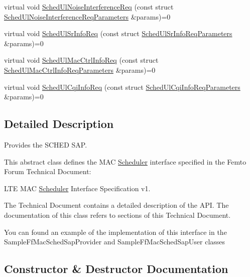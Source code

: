 \begin{DoxyCompactItemize}
\item 
virtual void \hyperlink{classns3_1_1FfMacSchedSapProvider_a0358723c15deebc70835395199a97c8b}{Sched\+Ul\+Noise\+Interference\+Req} (const struct \hyperlink{structns3_1_1FfMacSchedSapProvider_1_1SchedUlNoiseInterferenceReqParameters}{Sched\+Ul\+Noise\+Interference\+Req\+Parameters} \&params)=0
\item 
virtual void \hyperlink{classns3_1_1FfMacSchedSapProvider_a5e59aaa49b9baeb603f009c9b383767a}{Sched\+Ul\+Sr\+Info\+Req} (const struct \hyperlink{structns3_1_1FfMacSchedSapProvider_1_1SchedUlSrInfoReqParameters}{Sched\+Ul\+Sr\+Info\+Req\+Parameters} \&params)=0
\item 
virtual void \hyperlink{classns3_1_1FfMacSchedSapProvider_a00fdc735b5f273ce448bd465097e1370}{Sched\+Ul\+Mac\+Ctrl\+Info\+Req} (const struct \hyperlink{structns3_1_1FfMacSchedSapProvider_1_1SchedUlMacCtrlInfoReqParameters}{Sched\+Ul\+Mac\+Ctrl\+Info\+Req\+Parameters} \&params)=0
\item 
virtual void \hyperlink{classns3_1_1FfMacSchedSapProvider_aad26098eb7e7317f2d8287f11ab348d8}{Sched\+Ul\+Cqi\+Info\+Req} (const struct \hyperlink{structns3_1_1FfMacSchedSapProvider_1_1SchedUlCqiInfoReqParameters}{Sched\+Ul\+Cqi\+Info\+Req\+Parameters} \&params)=0
\end{DoxyCompactItemize}


\subsection{Detailed Description}
Provides the S\+C\+H\+ED S\+AP. 

This abstract class defines the M\+AC \hyperlink{classns3_1_1Scheduler}{Scheduler} interface specified in the Femto Forum Technical Document\+:
\begin{DoxyItemize}
\item L\+TE M\+AC \hyperlink{classns3_1_1Scheduler}{Scheduler} Interface Specification v1.
\end{DoxyItemize}

The Technical Document contains a detailed description of the A\+PI. The documentation of this class refers to sections of this Technical Document.

You can found an example of the implementation of this interface in the Sample\+Ff\+Mac\+Sched\+Sap\+Provider and Sample\+Ff\+Mac\+Sched\+Sap\+User classes 

\subsection{Constructor \& Destructor Documentation}

